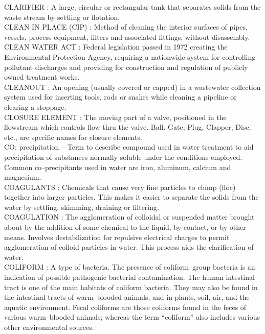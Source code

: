 \vspace{0.15cm}
CLARIFIER :   A large, circular or rectangular tank that separates solids from the waste stream by settling or flotation.\\
\vspace{0.15cm}
CLEAN IN PLACE (CIP) :  Method of cleaning the interior surfaces of pipes, vessels, process equipment, filters and associated fittings, without disassembly.\\
\vspace{0.15cm}
CLEAN WATER ACT :  Federal legislation passed in 1972 creating the Environmental Protection Agency, requiring a nationwide system for controlling pollutant discharges and providing for construction and regulation of publicly owned treatment works.\\
\vspace{0.15cm}
CLEANOUT :  An opening (usually covered or capped) in a wastewater collection system used for inserting tools, rods or snakes while cleaning a pipeline or clearing a stoppage. \\
\vspace{0.15cm}
CLOSURE ELEMENT :   The moving part of a valve, positioned in the flowstream which controls flow thru the valve. Ball. Gate, Plug, Clapper, Disc, etc., are specific names for closure elements.\\
\vspace{0.15cm}
CO: precipitation – Term to describe compound used in water treatment to aid precipitation of substances normally soluble under the conditions employed. Common co–precipitants used in water are iron, aluminum, calcium and magnesium.\\
\vspace{0.15cm}
COAGULANTS :  Chemicals that cause very fine particles to clump (floc) together into larger particles. This makes it easier to separate the solids from the water by settling, skimming, draining or filtering.\\
\vspace{0.15cm}
COAGULATION :   The agglomeration of colloidal or suspended matter brought about by the addition of some chemical to the liquid, by contact, or by other means.  Involves destabilization for repulsive electrical charges to permit agglomeration of colloid particles in water. This process aids the clarification of water.\\
\vspace{0.15cm}
COLIFORM :  A type of bacteria. The presence of coliform–group bacteria is an indication of possible pathogenic bacterial contamination. The human intestinal tract is one of the main habitats of coliform bacteria. They may also be found in the intestinal tracts of warm–blooded animals, and in plants, soil, air, and the aquatic environment. Fecal coliforms are those coliforms found in the feces of various warm–blooded animals; whereas the term “coliform” also includes various other environmental sources.\\
